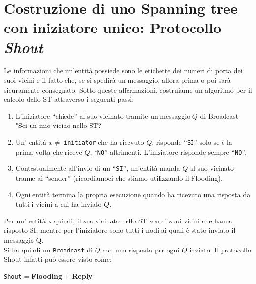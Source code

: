 \section{Costruzione di uno Spanning tree con iniziatore unico: Protocollo
  \textit{Shout}} Le informazioni che un'entità possiede sono le etichette dei
numeri di porta dei suoi vicini e il fatto che, se si spedirà un messaggio,
allora prima o poi sarà sicuramente consegnato. Sotto queste affermazioni,
costruiamo un algoritmo per il calcolo dello ST attraverso i seguenti passi:

\begin{enumerate}
    \item L'iniziatore ``chiede'' al suo vicinato tramite un messaggio $Q$ di
          Broadcast "Sei un mio vicino nello ST?
    \item Un' entità $x \neq $ \texttt{initiator} che ha ricevuto $Q$, risponde
          ``\texttt{SI}'' solo se è la prima volta che riceve $Q$, ``\texttt{NO}''
          altrimenti. L'iniziatore risponde sempre ``\texttt{NO}''.
    \item Contestualmente all'invio di un ``\texttt{SI}'', un'entità manda $Q$ al
          suo vicinato tranne ai ``sender'' (ricordiamoci che stiamo utilizzando il
          Flooding).
    \item Ogni entità termina la propria esecuzione quando ha ricevuto una
          risposta da tutti i vicini a cui ha inviato $Q$.
\end{enumerate}
Per un' entità x quindi, il suo vicinato nello ST sono i suoi vicini che hanno
risposto SI, mentre per l'iniziatore sono tutti i nodi ai quali è stato inviato
il messaggio Q.\\
Si ha quindi un \texttt{Broadcast} di $Q$ con una risposta per ogni $Q$ inviato.
Il protocollo Shout infatti può essere visto come:

\begin{center}
    \texttt{Shout} = \textbf{Flooding} + \textbf{Reply}
\end{center}

